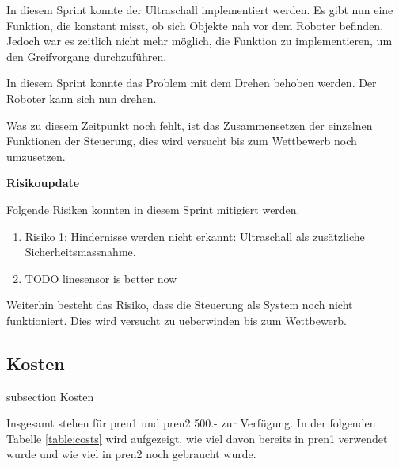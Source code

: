 In diesem Sprint konnte der Ultraschall implementiert werden. Es gibt nun eine Funktion, die konstant misst, ob sich Objekte nah vor dem Roboter befinden. Jedoch war es zeitlich nicht mehr möglich, die Funktion zu implementieren, um den Greifvorgang durchzuführen.

In diesem Sprint konnte  das Problem mit dem Drehen behoben werden. Der Roboter kann sich nun drehen.

Was zu diesem Zeitpunkt noch fehlt, ist das Zusammensetzen der einzelnen Funktionen der Steuerung, dies wird versucht bis zum Wettbewerb noch umzusetzen.

\textbf{Risikoupdate}

Folgende Risiken konnten in diesem Sprint mitigiert werden.

\begin{enumerate}
    \item Risiko 1: Hindernisse werden nicht erkannt: Ultraschall als zusätzliche Sicherheitsmassnahme.
    \item TODO linesensor is better now
\end{enumerate}

Weiterhin besteht das Risiko, dass die Steuerung als System noch nicht funktioniert. Dies wird versucht zu ueberwinden bis zum Wettbewerb.

\newpage

\subsection*{Kosten}\label{kosten}
    {subsection}
    {Kosten}

Insgesamt stehen für \acrshort{pren1} und \acrshort{pren2} 500.- zur Verfügung. In der folgenden Tabelle \ref{table:costs} wird aufgezeigt, wie viel davon bereits in \acrshort{pren1} verwendet wurde und wie viel in \acrshort{pren2} noch gebraucht wurde.


